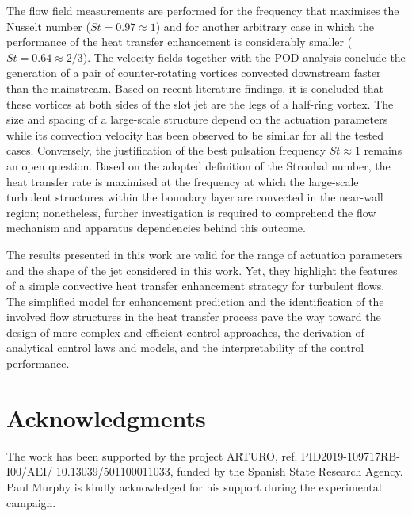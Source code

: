 The flow field measurements are performed for the frequency that maximises the Nusselt number ($St = 0.97 \approx 1$) and for another arbitrary case in which the performance of the heat transfer enhancement is considerably smaller ($St = 0.64 \approx 2/3$). The velocity fields together with the POD analysis conclude the generation of a pair of counter-rotating vortices convected downstream faster than the mainstream. Based on recent literature findings, it is concluded that these vortices at both sides of the slot jet are the legs of a half-ring vortex. The size and spacing of a large-scale structure depend on the actuation parameters while its convection velocity has been observed to be similar for all the tested cases. Conversely, the justification of the best pulsation frequency $St\approx 1$ remains an open question. Based on the adopted definition of the Strouhal number, the heat transfer rate is maximised at the frequency at which the large-scale turbulent structures within the boundary layer are convected in the near-wall region; nonetheless, further investigation is required to comprehend the flow mechanism and apparatus dependencies behind this outcome.

The results presented in this work are valid for the range of actuation parameters and the shape of the jet considered in this work. Yet, they highlight the features of a simple convective heat transfer enhancement strategy for turbulent flows. The simplified model for enhancement prediction and the identification of the involved flow structures in the heat transfer process pave the way toward the design of more complex and efficient control approaches, the derivation of analytical control laws and models, and the interpretability of the control performance.


\section*{Acknowledgments}
The work has been supported by the project ARTURO, ref. PID2019-109717RB-I00/AEI/ 10.13039/501100011033, funded by the Spanish State Research Agency. Paul Murphy is kindly acknowledged for his support during the experimental campaign.